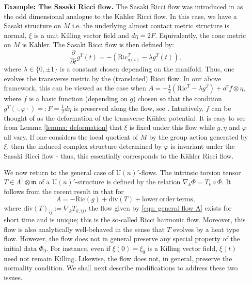 \documentclass{article}
\theoremstyle{definition}
\numberwithin{equation}{section}
\begin{document}
\textbf{Example: The Sasaki Ricci flow.}
The Sasaki Ricci flow was introduced in \cite{Smoczyk2010} as the odd dimensional analogue to the K\"ahler Ricci flow. In this case, we have a Sasaki structure on $M$ i.e. the underlying almost contact metric structure is normal, $\xi$ is a unit  Killing vector field and $d \eta=2 F$. Equivalently, the cone metric on $M$ is K\"ahler. The Sasaki Ricci flow is then defined by: 
\begin{equation*}
    \frac{\partial}{\partial t}g^T(t)=-(\mathrm{Ric}^T_{g(t)}-\lambda g^T(t)),
\end{equation*}
where $\lambda\in\{0,\pm1\}$ is a constant chosen depending on the manifold. Thus, one evolves the transverse metric by the (translated) Ricci flow. 
In our above framework, this can be viewed as the case when $A=-\frac{1}{2}(\mathrm{Ric}^T-\lambda g^T)+ d^cf\otimes \eta $, where $f$ is a basic function (depending on $g$) chosen so that the condition $g^T(\cdot ,\varphi \cdot )=:F=\frac{1}{2}d\eta$  is preserved along the flow, see \cite{Smoczyk2010}. Intuitively, $f$ can be thought of as the deformation of the transverse K\"ahler potential.
It is easy to see from Lemma \ref{lemma: deformation} that $\xi$ is fixed under this flow while $ g, \eta$ and $\varphi$ all vary. If one considers the local quotient of $M$ by the group action generated by $\xi$, then the induced complex structure determined by $\varphi$ is invariant under the Sasaki Ricci flow - thus, this essentially corresponds to the K\"ahler Ricci flow. 

We now return to the general case of $\mathrm{U}(n)'$-flows. The intrinsic torsion tensor $T\in \Lambda^1\otimes \mathfrak{m}$  of a $\mathrm{U}(n)'$-structure is defined by the relation $\nabla_k\Phi=T_k\diamond\Phi$. It follows from the recent result in \cite{fadelflows2} that for $$A=-\mathrm{Ric}(g)+\mathrm{div}(T)+\mathrm{lower \ order\ terms},$$ 
where $\mathrm{div}(T)_{ij}:=\nabla_kT_{k,ij}$, the flow given by \eqref{equ: general flow A} exists for short time and is unique; this is the so-called Ricci harmonic flow. Moreover, this flow is also analytically well-behaved in the sense that $T$ evolves by a heat type flow. However, the flow does not in general preserve any special property of the initial data $\Phi_0$. For instance, even if $\xi(0)=\xi_0$ is a Killing vector field, $\xi(t)$ need not remain Killing. Likewise, the flow does not, in general, preserve the normality condition. We shall next describe modifications to address these two issues.
\end{document}
